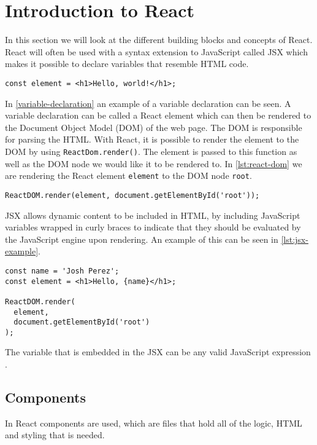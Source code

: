 \section{Introduction to React}\label{sec:intro-to-react}
In this section we will look at the different building blocks and concepts of React.
React will often be used with a syntax extension to JavaScript called JSX \cite{introducingJSX} which makes it possible to declare variables that resemble HTML code.

\begin{lstlisting}[caption={Variable declation in React}, captionpos=b, label={lst:variable-declaration}]
const element = <h1>Hello, world!</h1>;
\end{lstlisting}
In \autoref{variable-declaration} an example of a variable declaration can be seen. 
A variable declaration can be called a React element which can then be rendered to the Document Object Model (DOM) of the web page.
The DOM is responsible for parsing the HTML.
With React, it is possible to render the element to the DOM by using \texttt{ReactDom.render()}.
The element is passed to this function as well as the DOM node we would like it to be rendered to.
In \autoref{lst:react-dom} we are rendering the React element \texttt{element} to the DOM node \texttt{root}.

\begin{lstlisting}[caption={ReactDOM example}, captionpos=b, label={lst:react-dom}]
ReactDOM.render(element, document.getElementById('root'));
\end{lstlisting}
JSX allows dynamic content to be included in HTML, by including JavaScript variables wrapped in curly braces to indicate that they should be evaluated by the JavaScript engine upon rendering.
An example of this can be seen in \autoref{lst:jsx-example}.
\begin{lstlisting}[caption={JSX example}, captionpos=b, label={lst:jsx-example}]
const name = 'Josh Perez';
const element = <h1>Hello, {name}</h1>;

ReactDOM.render(
  element,
  document.getElementById('root')
);
\end{lstlisting}
The variable that is embedded in the JSX can be any valid JavaScript expression \cite{introducingJSX}.

\subsection*{Components}
In React components are used, which are files that hold all of the logic, HTML and styling that is needed.

